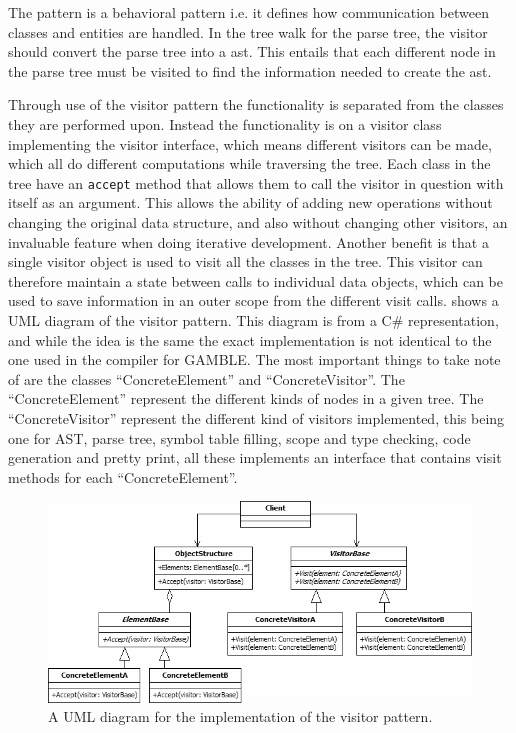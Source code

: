The pattern is a behavioral pattern i.e. it defines how communication between classes and entities are handled.
In the tree walk for the parse tree, the visitor should convert the parse tree into a \acrfull{ast}.
This entails that each different node in the parse tree must be visited to find the information needed to create the \acrfull{ast}.

Through use of the visitor pattern the functionality is separated from the classes they are performed upon. 
Instead the functionality is on a visitor class implementing the visitor interface, which means different visitors can be made, which all do different computations while traversing the tree.
Each class in the tree have an \texttt{accept} method that allows them to call the visitor in question with itself as an argument.
This allows the ability of adding new operations without changing the original data structure, and also without changing other visitors, an invaluable feature when doing iterative development.
Another benefit is that a single visitor object is used to visit all the classes in the tree.
This visitor can therefore maintain a state between calls to individual data objects, which can be used to save information in an outer scope from the different visit calls.
 shows a UML diagram of the visitor pattern.
This diagram is from a C\# representation, and while the idea is the same the exact implementation is not identical to the one used in the compiler for GAMBLE.
The most important things to take note of are the classes ``ConcreteElement'' and ``ConcreteVisitor''.
The ``ConcreteElement'' represent the different kinds of nodes in a given tree.
The ``ConcreteVisitor'' represent the different kind of visitors implemented, this being one for AST, parse tree, symbol table filling, scope and type checking, code generation and pretty print, all these implements an interface that contains visit methods for each ``ConcreteElement''.

\begin{figure}[!ht]
\centering
 \includegraphics[width=1\textwidth]{figures/VisitorPattern.png} %
\caption{A UML diagram for the implementation of the visitor pattern.}\label{image:visitor}
\vspace{-15pt}
\end{figure}


